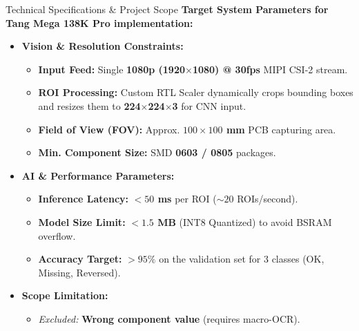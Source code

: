 \documentclass[t, aspectratio=169]{beamer}
\begin{document}
	\begin{frame}{Technical Specifications \& Project Scope}
		\textbf{Target System Parameters for Tang Mega 138K Pro implementation:}
		
		\vspace{0.5em}
		\begin{itemize}
			\item \textbf{Vision \& Resolution Constraints:} 
            \begin{itemize}
                \item \textbf{Input Feed:} Single \textbf{1080p (1920$\times$1080) @ 30fps} MIPI CSI-2 stream.
                \item \textbf{ROI Processing:} Custom RTL Scaler dynamically crops bounding boxes and resizes them to \textbf{224$\times$224$\times$3} for CNN input.
                \item \textbf{Field of View (FOV):} Approx. \textbf{$100 \times 100$ mm} PCB capturing area.
                \item \textbf{Min. Component Size:} SMD \textbf{0603 / 0805} packages.
            \end{itemize}
            
			\item \textbf{AI \& Performance Parameters:} 
            \begin{itemize}
                \item \textbf{Inference Latency:} \textbf{$<50$ ms} per ROI ($\sim 20$ ROIs/second).
                \item \textbf{Model Size Limit:} \textbf{$< 1.5$ MB} (INT8 Quantized) to avoid BSRAM overflow.
                \item \textbf{Accuracy Target:} \textbf{$> 95\%$} on the validation set for 3 classes (OK, Missing, Reversed).
            \end{itemize}
            
            \item \textbf{Scope Limitation:} 
            \begin{itemize}
                \item \alert{\textit{Excluded:}} \textbf{Wrong component value} (requires macro-OCR).
            \end{itemize}
		\end{itemize}
	\end{frame}
	
\end{document}
